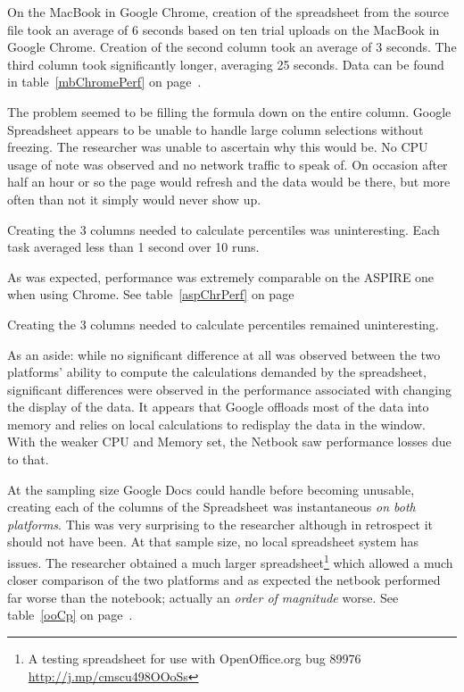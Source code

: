 On the MacBook in Google Chrome, creation of the spreadsheet from the source
file took an average of 6 seconds based on ten trial uploads on the MacBook in
Google Chrome. Creation of the second column took an average of 3 seconds. The
third column took significantly longer, averaging 25 seconds. Data can be found
in table~\ref{mbChromePerf} on page~\pageref{mbChromePerf}.



The problem seemed to be filling the formula down on the entire column.  Google
Spreadsheet appears to be unable to handle large column selections without
freezing.  The researcher was unable to ascertain why this would be.  No CPU
usage of note was observed and no network traffic to speak of.  On occasion
after half an hour or so the page would refresh and the data would be there, but
more often than not it simply would never show up.

Creating the 3 columns needed to calculate percentiles was uninteresting.  Each
task averaged less than 1 second over 10 runs.

As was expected, performance was extremely comparable on the ASPIRE one when
using Chrome. See table~\ref{aspChrPerf} on page~\pageref{aspChrPerf}



Creating the 3 columns needed to calculate percentiles remained uninteresting.

As an aside: while no significant difference at all was observed between the
two platforms' ability to compute the calculations demanded by the spreadsheet,
significant differences were observed in the performance associated with
changing the display of the data.  It appears that Google offloads most of the
data into memory and relies on local calculations to redisplay the data in the
window.  With the weaker CPU and Memory set, the Netbook saw performance losses
due to that.

At the sampling size Google Docs could handle before becoming unusable, creating
each of the columns of the Spreadsheet was instantaneous \emph{on both
  platforms}.  This was very surprising to the researcher although in retrospect
it should not have been.  At that sample size, no local spreadsheet system has
issues.  The researcher obtained a much larger spreadsheet\footnote{A testing
  spreadsheet for use with OpenOffice.org bug 89976
  \url{http://j.mp/cmscu498OOoSs}} which allowed a much closer comparison of the
two platforms and as expected the netbook performed far worse than the notebook;
actually an \emph{order of magnitude} worse. See table~\ref{ooCp} on page~\pageref{ooCp}.

